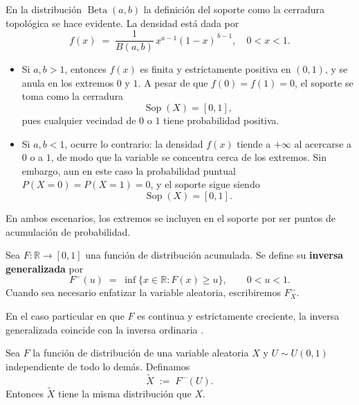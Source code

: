 \documentclass[../Main.tex]{subfiles}
\begin{document}
\begin{remark}
En la distribución $\operatorname{Beta}(a,b)$ la definición del soporte como la cerradura topológica se hace evidente.  
La densidad está dada por
\[
   f(x) \;=\; \frac{1}{B(a,b)} \, x^{a-1} (1-x)^{\,b-1}, \quad 0 < x < 1.
\]

\begin{itemize}
   \item Si $a,b>1$, entonces $f(x)$ es finita y estrictamente positiva en $(0,1)$, y se anula en los extremos $0$ y $1$.  
   A pesar de que $f(0)=f(1)=0$, el soporte se toma como la cerradura
   \[
      \operatorname{Sop}(X) = [0,1],
   \]
   pues cualquier vecindad de $0$ o $1$ tiene probabilidad positiva.

   \item Si $a,b<1$, ocurre lo contrario: la densidad $f(x)$ tiende a $+\infty$ al acercarse a $0$ o a $1$, de modo que la variable se concentra cerca de los extremos.  
   Sin embargo, aun en este caso la probabilidad puntual $P(X=0)=P(X=1)=0$, y el soporte sigue siendo
   \[
      \operatorname{Sop}(X) = [0,1].
   \]
\end{itemize}

En ambos escenarios, los extremos se incluyen en el soporte por ser puntos de acumulación de probabilidad.
\end{remark}

\begin{definition}
\label{}
Sea $F:\mathbb R\to[0,1]$ una función de distribución acumulada.
Se define su \textbf{inversa generalizada} por
\[
    F^{-}(u)\;=\;
    \inf\bigl\{x\in\mathbb R : F(x)\ge u\bigr\},
    \qquad 0<u<1.
\]
Cuando sea necesario enfatizar la variable aleatoria,
escribiremos $F_X^{-}$.
\end{definition}

\begin{remark}
En el caso particular en que $F$ es continua y estrictamente creciente,
la inversa generalizada coincide con la inversa ordinaria \cite{BaltazarLarios2024}.
\end{remark}

\begin{lemma}
\label{}
Sea $F$ la función de distribución de una variable aleatoria $X$ y
$U\sim U(0,1)$ independiente de todo lo demás.
Definamos
\[
    \tilde X \;:=\; F^{-}(U).
\]
Entonces $\tilde X$ tiene la misma distribución que $X$.
\end{lemma}
\end{document}
